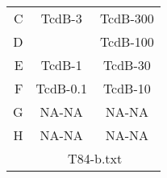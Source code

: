 \begin{adjustwidth}{0in}{3in}
{{\begin{tabular}{r|c|c|}
  \cline{2-3}\multirow{ 1 }{*}{ C } & TcdB-3 & TcdB-300 \\ 
  \cline{2-3}\multirow{ 1 }{*}{ D } &  & TcdB-100 \\ 
  \cline{2-3}\multirow{ 1 }{*}{ E } & TcdB-1 & TcdB-30 \\ 
  \cline{2-3}\multirow{ 1 }{*}{ F } & TcdB-0.1 & TcdB-10 \\ 
  \cline{2-3}\multirow{ 1 }{*}{ G } & NA-NA & NA-NA \\ 
  \cline{2-3}\multirow{ 1 }{*}{ H } & NA-NA & NA-NA \\ 
   \cline{2-3} \multicolumn{1}{c}{} & \multicolumn{2}{c}{T84-b.txt}\end{tabular}
}
 } \end{adjustwidth}

\doublespacing

